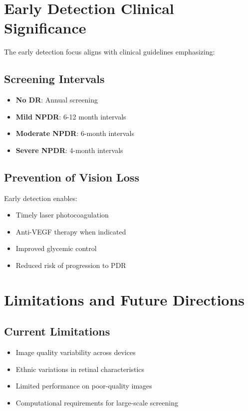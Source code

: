 \documentclass[12pt,a4paper]{article}
\begin{document}
\section{Early Detection Clinical Significance}

The early detection focus aligns with clinical guidelines \cite{american2018diabetic} emphasizing:

\subsection{Screening Intervals}
\begin{itemize}
    \item \textbf{No DR}: Annual screening
    \item \textbf{Mild NPDR}: 6-12 month intervals
    \item \textbf{Moderate NPDR}: 6-month intervals
    \item \textbf{Severe NPDR}: 4-month intervals
\end{itemize}

\subsection{Prevention of Vision Loss}
Early detection enables:
\begin{itemize}
    \item Timely laser photocoagulation
    \item Anti-VEGF therapy when indicated
    \item Improved glycemic control
    \item Reduced risk of progression to PDR
\end{itemize}

\section{Limitations and Future Directions}

\subsection{Current Limitations}
\begin{itemize}
    \item Image quality variability across devices
    \item Ethnic variations in retinal characteristics
    \item Limited performance on poor-quality images
    \item Computational requirements for large-scale screening
\end{itemize}
\end{document}
